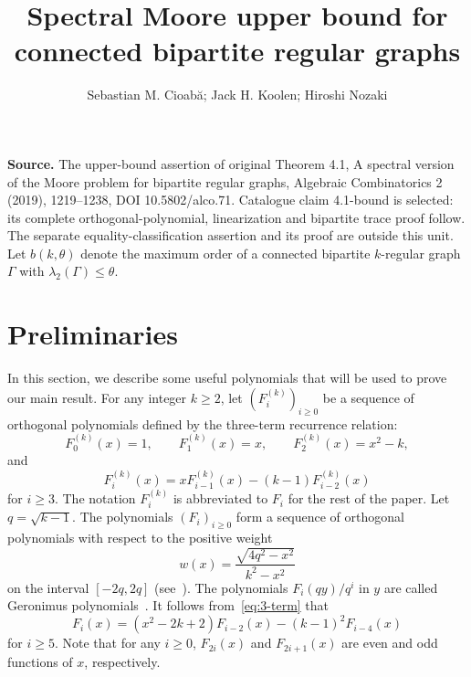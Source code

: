 \documentclass[10pt]{amsart}
\title[Spectral Moore bound]{Spectral Moore upper bound for connected bipartite regular graphs}
\author{Sebastian M. Cioab\u{a}; Jack H. Koolen; Hiroshi Nozaki}
\date{}
\begin{document}
\maketitle
\noindent\textbf{Source.} The upper-bound assertion of original Theorem 4.1, A spectral version of the Moore problem for bipartite regular graphs, Algebraic Combinatorics 2 (2019), 1219--1238, DOI 10.5802/alco.71. Catalogue claim 4.1-bound is selected: its complete orthogonal-polynomial, linearization and bipartite trace proof follow. The separate equality-classification assertion and its proof are outside this unit.
Let $b(k,\theta)$ denote the maximum order of a connected bipartite $k$-regular graph $\Gamma$ with $\lambda_2(\Gamma) \leq \theta$. 
\setcounter{section}{1}
\section{Preliminaries} \label{sec:pre}
In this section, we describe some useful polynomials that will be used to prove our main result. For any integer $k\geq 2$, let $(F_i^{(k)})_{i\geq 0}$ be a sequence of orthogonal polynomials defined by the three-term recurrence relation: 
\begin{equation*}
F_0^{(k)}(x)=1, \qquad F_1^{(k)}(x)=x, \qquad F_2^{(k)}(x)=x^2 - k, 
\end{equation*}
and
\begin{equation} \label{eq:3-term}
F_i^{(k)}(x)=x F_{i-1}^{(k)}(x)- (k-1) F_{i-2}^{(k)}(x)
\end{equation}
for $i\geq 3$. 
The notation $F_i^{(k)}$ is abbreviated to $F_i$ for the rest of the paper. Let $q=\sqrt{k-1}$. The polynomials $(F_i)_{i\geq 0}$ form a sequence of orthogonal polynomials 
with respect to the positive weight
\[
w(x)=\frac{\sqrt{4q^2-x^2}}{k^2-x^2}
\]
on the interval $[-2q, 2q]$ 
(see~\cite[Section~4]{HOb}). 
The polynomials $F_i(q y)/ q^i$ in $y$ are called Geronimus
polynomials~\cite{G30,H15}. 
It follows from~\eqref{eq:3-term} that 
\begin{equation} \label{eq:3-term2}
F_i(x)=(x^2-2k+2) F_{i-2}(x)- (k-1)^2 F_{i-4}(x)
\end{equation}
for $i\geq 5$. Note that for any $i\geq 0$, $F_{2i}(x)$ and $F_{2i+1}(x)$ are 
even and odd functions of $x$, respectively.
\end{document}
